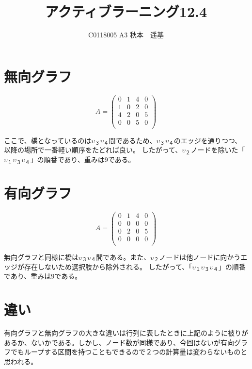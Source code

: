 \documentclass[uplatex]{jsarticle} %
\title{アクティブラーニング12.4}
\author{C0118005 A3 秋本　遥基}
\date{}
\begin{document}
\maketitle

\section{無向グラフ}

\[
  A = \left(
    \begin{array}{rrrr}
      0 & 1 & 4 & 0 \\
      1 & 0 & 2 & 0 \\
      4 & 2 & 0 & 5 \\
      0 & 0 & 5 & 0 \\
    \end{array}
  \right)
\]

ここで、橋となっているのは$ \upsilon_３\upsilon_４$間であるため、$ \upsilon_３\upsilon_４$のエッジを通りつつ、以降の場所で一番軽い順序をたどれば良い。
したがって、$ \upsilon_２$ノードを除いた「$ \upsilon_１\upsilon_３\upsilon_４$」の順番であり、重みは$9$である。

\section{有向グラフ}

\[
  A = \left(
    \begin{array}{rrrr}
      0 & 1 & 4 & 0 \\
      0 & 0 & 0 & 0 \\
      0 & 2 & 0 & 5 \\
      0 & 0 & 0 & 0 \\
    \end{array}
  \right)
\]

無向グラフと同様に橋は$ \upsilon_３\upsilon_４$間である。また、$ \upsilon_２$ノードは他ノードに向かうエッジが存在しないため選択肢から除外される。
したがって、「$ \upsilon_１\upsilon_３\upsilon_４$」の順番であり、重みは$9$である。

\section{違い}

有向グラフと無向グラフの大きな違いは行列に表したときに上記のように被りがあるか、ないかである。しかし、ノード数が同様であり、今回はないが有向グラフでもループする区間を持つこともできるので２つの計算量は変わらないものと思われる。

\end{document}
